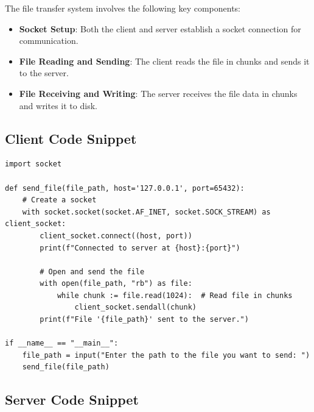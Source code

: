 \documentclass{article}
\begin{document}
The file transfer system involves the following key components:
\begin{itemize}
    \item \textbf{Socket Setup}: Both the client and server establish a socket connection for communication.
    \item \textbf{File Reading and Sending}: The client reads the file in chunks and sends it to the server.
    \item \textbf{File Receiving and Writing}: The server receives the file data in chunks and writes it to disk.
\end{itemize}

\subsection{Client Code Snippet}

\begin{lstlisting}[style=mypython]
import socket

def send_file(file_path, host='127.0.0.1', port=65432):
    # Create a socket
    with socket.socket(socket.AF_INET, socket.SOCK_STREAM) as client_socket:
        client_socket.connect((host, port))
        print(f"Connected to server at {host}:{port}")
        
        # Open and send the file
        with open(file_path, "rb") as file:
            while chunk := file.read(1024):  # Read file in chunks
                client_socket.sendall(chunk)
        print(f"File '{file_path}' sent to the server.")

if __name__ == "__main__":
    file_path = input("Enter the path to the file you want to send: ")
    send_file(file_path)
\end{lstlisting}

\subsection{Server Code Snippet}
\end{document}
